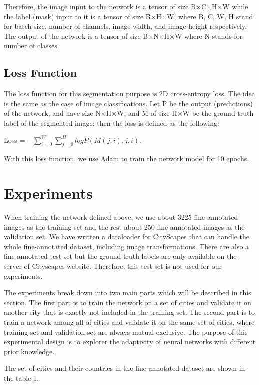 \documentclass[10pt,twocolumn,letterpaper]{article}
\begin{document}
Therefore, the image input to the network is a tensor of size B$\times$C$\times$H$\times$W while the label (mask) input to it is a tensor of size B$\times$H$\times$W, where B, C, W, H stand for batch size, number of channels, image width, and image height respectively. The output of the network is a tensor of size B$\times$N$\times$H$\times$W where N stands for number of classes.

\subsection{Loss Function}
The loss function for this segmentation purpose is 2D cross-entropy loss. The idea is the same as the case of image classifications. Let P be the output (predictions) of the network, and have size N$\times$H$\times$W, and M of size H$\times$W be the ground-truth label of the segmented image; then the loss is defined as the following:
\begin{center}
	Loss = $-\sum_{i=0}^{W}\sum_{j=0}^{H}logP(M(j,i),j,i)$.
\end{center}
With this loss function, we use Adam to train the network model for 10 epochs.

\section{Experiments}
When training the network defined above, we use about 3225 fine-annotated images as the training set and the rest about 250 fine-annotated images as the validation set. We have written a dataloader for CityScapes that can handle the whole fine-annotated dataset, including image transformations. There are also a fine-annotated test set but the ground-truth labels are only available on the server of Cityscapes website. Therefore, this test set is not used for our experiments.

The experiments break down into two main parts which will be described in this section. The first part is to train the network on a set of cities and validate it on another city that is exactly not included in the training set. The second part is to train a network among all of cities and validate it on the same set of cities, where training set and validation set are always mutual exclusive. The purpose of this experimental design is to explorer the adaptivity of neural networks with different prior knowledge.

The set of cities and their countries in the fine-annotated dataset are shown in the table 1.
\end{document}
